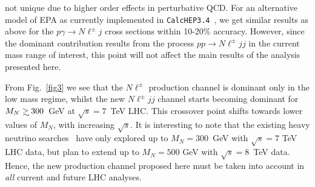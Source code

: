 \documentclass[reprint,prl,twocolumn,superscriptaddress,showpacs,nofootinbib,floatfix,preprintnumbers]{revtex4-1}
\def\gsim{\mathrel{\rlap{\lower4pt\hbox{\hskip1pt$\sim$}}
    \raise1pt\hbox{$>$}}}                %
\begin{document}
not unique due to higher order effects in perturbative QCD. 
For an alternative model of EPA as currently implemented in {\tt CalcHEP3.4}~\cite{calchep}, 
we get similar results as above 
for the $p\gamma\to N\ell^\pm j$ cross sections within 10-20\% accuracy.  
However, since the
dominant contribution  results from the process  $pp\to N\ell^\pm jj$ 
in the current mass range of interest, 
this point will not affect the main results of the analysis presented here. 

From  Fig.~\ref{fig3} we  see  that the  $N\ell^\pm$  production
channel is dominant only in the  low mass regime, whilst the new
$N\ell^\pm   jj$   channel   starts   becoming   dominant   for   $M_N
\gsim 300$~GeV at $\sqrt s=7$~TeV LHC.  This crossover point  shifts towards lower values of $M_N$,
with  increasing  $\sqrt s$.   It  is  interesting  to note  that  the
existing  heavy neutrino  searches~\cite{CMS-LL,  ATLAS-LL} have  only
explored  up to  $M_N=300$~GeV  with $\sqrt  s=7$ TeV LHC  data, 
but plan to extend up to $M_N=500$ GeV
with  $\sqrt  s=8$~TeV data.  Hence,  the  new production
channel  proposed here  must be  taken into  account in
{\em all} current and future LHC analyses.
\end{document}
